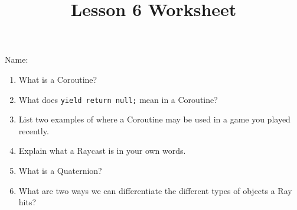 \documentclass[12pt]{../rhitcsse}
\title{Lesson 6 Worksheet}
\begin{document}
\maketitle

\vspace*{0.15in}\hspace{0.25in}Name:\hrulefill\hspace{0.25in}\hspace{0.25in}

\begin{enumerate}
  \item What is a Coroutine?
  \vfill
  \item What does \texttt{yield return null;} mean in a Coroutine?
  \vfill 
  \item List two examples of where a Coroutine may be used in a game you played recently.
  \vfill
  \clearpage
  \item Explain what a Raycast is in your own words.
  \vfill
  \item What is a Quaternion?
  \vfill
  \item What are two ways we can differentiate the different types of objects a Ray hits?
  \vfill


\end{enumerate}
\end{document}

